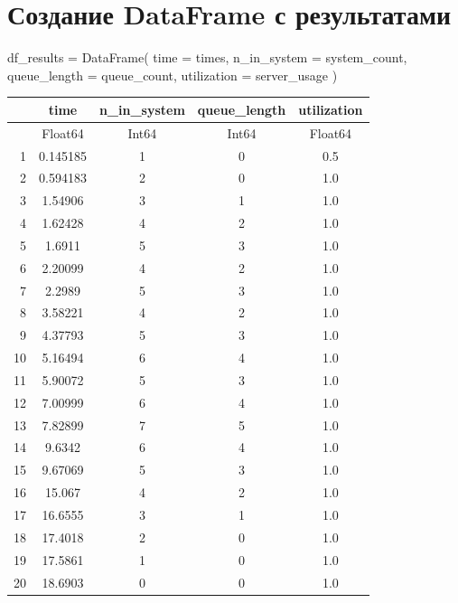 \documentclass[
  12pt,
  a4paper,
  DIV=11,
  numbers=noendperiod]{scrreprt}
\newenvironment{Shaded}{\begin{snugshade}}{\end{snugshade}}
\newcommand{\FunctionTok}[1]{\textcolor[rgb]{0.28,0.35,0.67}{#1}}
\newcommand{\NormalTok}[1]{\textcolor[rgb]{0.00,0.23,0.31}{#1}}
\newcommand{\OperatorTok}[1]{\textcolor[rgb]{0.37,0.37,0.37}{#1}}
\begin{document}
\section{Создание DataFrame с
результатами}\label{ux441ux43eux437ux434ux430ux43dux438ux435-dataframe-ux441-ux440ux435ux437ux443ux43bux44cux442ux430ux442ux430ux43cux438}

\begin{Shaded}
\begin{Highlighting}[]
\NormalTok{df\_results }\OperatorTok{=} \FunctionTok{DataFrame}\NormalTok{(}
\NormalTok{    time }\OperatorTok{=}\NormalTok{ times,}
\NormalTok{    n\_in\_system }\OperatorTok{=}\NormalTok{ system\_count,}
\NormalTok{    queue\_length }\OperatorTok{=}\NormalTok{ queue\_count,}
\NormalTok{    utilization }\OperatorTok{=}\NormalTok{ server\_usage}
\NormalTok{)}
\end{Highlighting}
\end{Shaded}

\begin{tabular}{r|cccc}
    & time & n\_in\_system & queue\_length & utilization\\
    \hline
    & Float64 & Int64 & Int64 & Float64\\
    \hline
    1 & 0.145185 & 1 & 0 & 0.5 \\
    2 & 0.594183 & 2 & 0 & 1.0 \\
    3 & 1.54906 & 3 & 1 & 1.0 \\
    4 & 1.62428 & 4 & 2 & 1.0 \\
    5 & 1.6911 & 5 & 3 & 1.0 \\
    6 & 2.20099 & 4 & 2 & 1.0 \\
    7 & 2.2989 & 5 & 3 & 1.0 \\
    8 & 3.58221 & 4 & 2 & 1.0 \\
    9 & 4.37793 & 5 & 3 & 1.0 \\
    10 & 5.16494 & 6 & 4 & 1.0 \\
    11 & 5.90072 & 5 & 3 & 1.0 \\
    12 & 7.00999 & 6 & 4 & 1.0 \\
    13 & 7.82899 & 7 & 5 & 1.0 \\
    14 & 9.6342 & 6 & 4 & 1.0 \\
    15 & 9.67069 & 5 & 3 & 1.0 \\
    16 & 15.067 & 4 & 2 & 1.0 \\
    17 & 16.6555 & 3 & 1 & 1.0 \\
    18 & 17.4018 & 2 & 0 & 1.0 \\
    19 & 17.5861 & 1 & 0 & 1.0 \\
    20 & 18.6903 & 0 & 0 & 1.0 \\
\end{tabular}
\end{document}
